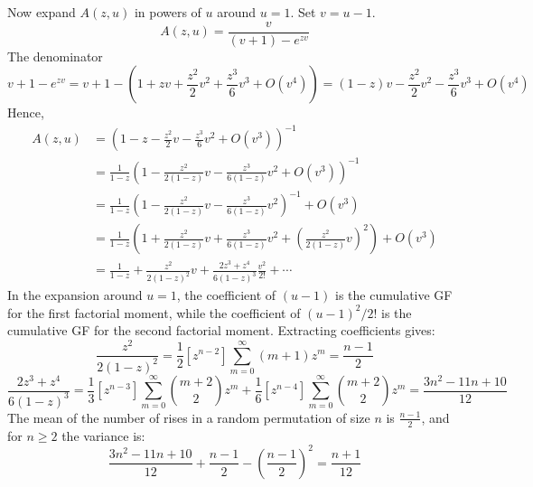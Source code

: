 Now expand $A(z, u)$ in powers of $u$ around $u = 1$. Set $v = u - 1$.
\begin{equation*}
    A(z, u) = \frac{v}{(v + 1) - e^{zv}}
\end{equation*}
The denominator
\begin{equation*}
    v + 1 - e^{zv} = v + 1 - \left(1 + zv + \frac{z^{2}}{2}v^{2} + \frac{z^{3}}{6}v^{3} + O(v^{4})\right)
        = (1 - z)v - \frac{z^{2}}{2}v^{2} - \frac{z^{3}}{6}v^{3} + O(v^{4})
\end{equation*}
Hence,
\begin{equation*}
    \begin{aligned}
        A(z, u)
        &= \left(1 - z - \frac{z^{2}}{2}v - \frac{z^{3}}{6}v^{2} + O(v^{3})\right)^{-1} \\
        &= \frac{1}{1 - z} \left(1 - \frac{z^{2}}{2(1 - z)}v - \frac{z^{3}}{6(1 - z)}v^{2} + O(v^{3})\right)^{-1} \\
        &= \frac{1}{1 - z} \left(1 - \frac{z^{2}}{2(1 - z)}v - \frac{z^{3}}{6(1 - z)}v^{2}\right)^{-1} + O(v^{3}) \\
        &= \frac{1}{1 - z} \left(1 + \frac{z^{2}}{2(1 - z)}v + \frac{z^{3}}{6(1 - z)}v^{2} + \left(\frac{z^{2}}{2(1 - z)}v\right)^{2}\right) + O(v^{3}) \\
        &= \frac{1}{1 - z} + \frac{z^{2}}{2(1 - z)^{2}}v + \frac{2z^{3} + z^{4}}{6(1 - z)^{3}} \frac{v^{2}}{2!} + \cdots
    \end{aligned}
\end{equation*}
In the expansion around $u=1$, the coefficient of $(u-1)$ is the cumulative GF for the
first factorial moment, while the coefficient of $(u-1)^2/2!$ is the cumulative GF for the
second factorial moment.
Extracting coefficients gives:
\begin{equation*}
    [z^{n}] \frac{z^{2}}{2(1 - z)^{2}} = \frac{1}{2} [z^{n - 2}] \sum_{m = 0}^{\infty}(m + 1)z^{m} = \frac{n - 1}{2}
\end{equation*}
\begin{equation*}
    [z^{n}] \frac{2z^{3} + z^{4}}{6(1 - z)^{3}}
        = \frac{1}{3} [z^{n - 3}] \sum_{m = 0}^{\infty} \binom{m + 2}{2} z^{m} + \frac{1}{6} [z^{n - 4}] \sum_{m = 0}^{\infty} \binom{m + 2}{2} z^{m}
        = \frac{3n^{2} - 11n + 10}{12}
\end{equation*}
The mean of the number of rises in a random permutation of size $n$ is $\frac{n - 1}{2}$, and for $n\geq 2$ the variance is:
\begin{equation*}
    \frac{3n^{2} - 11n + 10}{12} + \frac{n - 1}{2} - \left(\frac{n - 1}{2} \right)^{2} = \frac{n + 1}{12}
\end{equation*}

